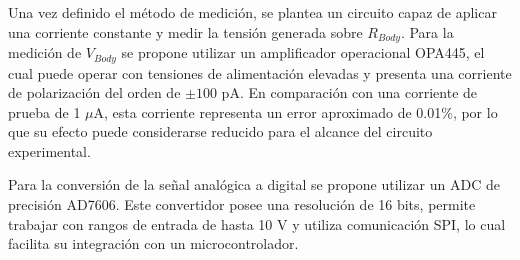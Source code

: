 Una vez definido el método de medición, se plantea un circuito capaz de aplicar
una corriente constante y medir la tensión generada sobre $R_{Body}$. Para la
medición de $V_{Body}$ se propone utilizar un amplificador operacional OPA445,
el cual puede operar con tensiones de alimentación elevadas y presenta una
corriente de polarización del orden de $\pm 100$ pA. En comparación con una
corriente de prueba de 1 $\mu$A, esta corriente representa un error aproximado
de 0.01\%, por lo que su efecto puede considerarse reducido para el alcance del
circuito experimental.

Para la conversión de la señal analógica a digital se propone utilizar un ADC de
precisión AD7606. Este convertidor posee una resolución de 16 bits, permite
trabajar con rangos de entrada de hasta 10 V y utiliza comunicación SPI, lo cual
facilita su integración con un microcontrolador.
